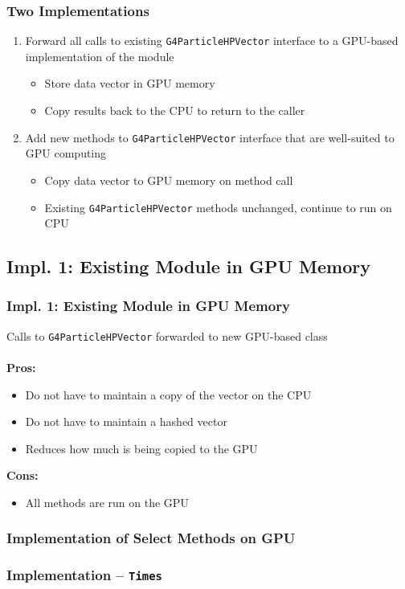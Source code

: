\documentclass{beamer}
\newcommand\pro{\item[$+$]}
\newcommand\con{\item[$-$]}
\begin{document}
\begin{frame}
\frametitle{Two Implementations}
\begin{enumerate}
\item Forward all calls to existing \texttt{G4ParticleHPVector} interface to a GPU-based implementation of the module

\begin{itemize}
\item Store data vector in GPU memory
\item Copy results back to the CPU to return to the caller
\end{itemize}

\item Add new methods to \texttt{G4ParticleHPVector} interface that are well-suited to GPU computing
\begin{itemize}
\item Copy data vector to GPU memory on method call
\item Existing \texttt{G4ParticleHPVector} methods unchanged, continue to run on CPU
\end{itemize}
\end{enumerate}
\end{frame}

\subsection{Impl. 1: Existing Module in GPU Memory}
\begin{frame}
\frametitle{Impl. 1: Existing Module in GPU Memory}
Calls to \texttt{G4ParticleHPVector} forwarded to new GPU-based class\\~\\ %

\textbf{Pros:}
\begin{itemize}
\pro Do not have to maintain a copy of the vector on the CPU
\pro Do not have to maintain a hashed vector
\pro Reduces how much is being copied to the GPU
\end{itemize}
\textbf{Cons:}
\begin{itemize}
\con All methods are run on the GPU
\end{itemize}
\end{frame}

\subsubsection{Implementation of Select Methods on GPU}
\begin{frame}
\frametitle{Implementation -- \texttt{Times}}
\end{frame}
\end{document}
